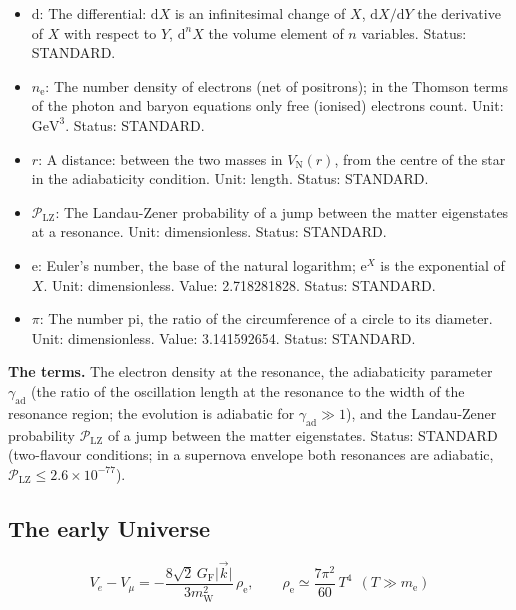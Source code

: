 \documentclass[
  10pt,
]{article}
\begin{document}
\begin{itemize}
  \(\gamma_{\mathrm{ad}}\): The adiabaticity parameter of a resonance
  (adiabatic for \(\gamma_{\mathrm{ad}} \gg 1\)). Unit: dimensionless.
  Status: STANDARD.
\item
  \(\mathrm{d}\): The differential: \(\mathrm{d}X\) is an infinitesimal
  change of \(X\), \(\mathrm{d}X/\mathrm{d}Y\) the derivative of \(X\)
  with respect to \(Y\), \(\mathrm{d}^nX\) the volume element of \(n\)
  variables. Status: STANDARD.
\item
  \(n_{\mathrm{e}}\): The number density of electrons (net of
  positrons); in the Thomson terms of the photon and baryon equations
  only free (ionised) electrons count. Unit: \(\mathrm{GeV}^{3}\).
  Status: STANDARD.
\item
  \(r\): A distance: between the two masses in \(V_{\mathrm{N}}(r)\),
  from the centre of the star in the adiabaticity condition. Unit:
  length. Status: STANDARD.
\item
  \(\mathcal{P}_{\mathrm{LZ}}\): The Landau-Zener probability of a jump
  between the matter eigenstates at a resonance. Unit: dimensionless.
  Status: STANDARD.
\item
  \(\mathrm{e}\): Euler's number, the base of the natural logarithm;
  \(\mathrm{e}^{X}\) is the exponential of \(X\). Unit: dimensionless.
  Value: 2.718281828. Status: STANDARD.
\item
  \(\pi\): The number pi, the ratio of the circumference of a circle to
  its diameter. Unit: dimensionless. Value: 3.141592654. Status:
  STANDARD.
\end{itemize}

\textbf{The terms.} The electron density at the resonance, the
adiabaticity parameter \(\gamma_{\mathrm{ad}}\) (the ratio of the
oscillation length at the resonance to the width of the resonance
region; the evolution is adiabatic for \(\gamma_{\mathrm{ad}} \gg 1\)),
and the Landau-Zener probability \(\mathcal{P}_{\mathrm{LZ}}\) of a jump
between the matter eigenstates. Status: STANDARD (two-flavour
conditions; in a supernova envelope both resonances are adiabatic,
\(\mathcal{P}_{\mathrm{LZ}} \le 2.6\times10^{-77}\)).

\hypertarget{the-early-universe}{%
\subsection{The early Universe}\label{the-early-universe}}

\[
V_e - V_\mu = -\frac{8\sqrt2\,G_{\mathrm{F}}\lvert\vec k\rvert}{3m_{\mathrm{W}}^2}\,\rho_{\mathrm{e}},\qquad
\rho_{\mathrm{e}} \simeq \frac{7\pi^2}{60}\,T^4\ \ (T \gg m_{\mathrm{e}}) \tag{FE-109}
\]
\end{document}
